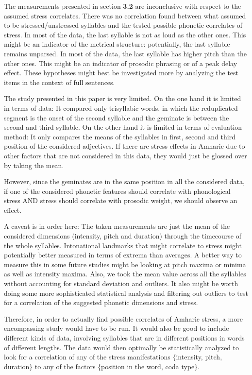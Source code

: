 \documentclass[12pt]{scrartcl}
\begin{document}
The measurements presented in section \textbf{3.2} are inconclusive with respect to the assumed stress correlates. There was no correlation found between what \cite{sande2017} assumed to be stressed/unstressed syllables and the tested possible phonetic correlates of stress. In most of the data, the last syllable is not as loud as the other ones. This might be an indicator of the metrical structure: potentially, the last syllable remains unparsed. In most of the data, the last syllable has higher pitch than the other ones. This might be an indicator of prosodic phrasing or of a peak delay effect. These hypotheses might best be investigated more by analyzing the test items in the context of full sentences.

The study presented in this paper is very limited. On the one hand it is limited in terms of data: It compared only trisyllabic words, in which the reduplicated segment is the onset of the second syllable and the geminate is between the second and third syllable. On the other hand it is limited in terms of evaluation method: It only compares the means of the syllables in first, second and third position of the considered adjectives. If there are stress effects in Amharic due to other factors that are not considered in this data, they would just be glossed over by taking the mean.

However, since the geminates are in the same position in all the considered data, if one of the considered phonetic features should correlate with phonological stress AND stress should correlate with prosodic weight, we should observe an effect.

A caveat is in order here: The taken measurements are just the mean of the considered dimensions (intensity, pitch and duration) through the timecourse of the whole syllables. Intonational landmarks that might correlate to stress might potentially better measured in terms of extrema than averages. A better way to measure this in some future studies might be looking at pitch maxima or minima as well as intensity maxima. Also, we took the mean value across all the syllables without accounting for standard deviation and outliers. It also might be worth doing some more sophisticated statistical analysis and filtering out outliers to test for a correlation of the suggested phonetic dimensions and stress.

Therefore, in order to actually find possible correlates of Amharic stress, a more encompassing study would have to be run. It would also be good to include different kinds of data, involving syllables that are in different positions in words of different lengths. The data would then optimally be statistically analyzed to look for a correlation of any of the stress manifestations $\{$intensity, pitch, duration$\}$ to any of the factors $\{$position in the word, coda type$\}$.
\end{document}
